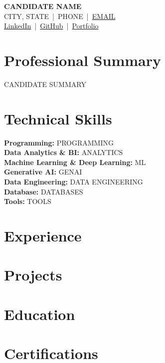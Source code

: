 \documentclass[10pt,a4paper]{article}
\begin{document}
\begin{center}
    {\LARGE\textbf{CANDIDATE NAME}}\\[2pt]
    CITY, STATE \,|\, PHONE \,|\, \href{mailto:EMAIL}{EMAIL}\\[1pt]
    \href{LINKEDIN}{LinkedIn} \,|\, \href{GITHUB}{GitHub} \,|\, \href{PORTFOLIO}{Portfolio}
\end{center}
\section*{Professional Summary}
CANDIDATE SUMMARY
\section*{Technical Skills}
\textbf{Programming:} PROGRAMMING\\
\textbf{Data Analytics \& BI:} ANALYTICS\\
\textbf{Machine Learning \& Deep Learning:} ML\\
\textbf{Generative AI:} GENAI\\
\textbf{Data Engineering:} DATA ENGINEERING\\
\textbf{Database:} DATABASES\\
\textbf{Tools:} TOOLS
\section*{Experience}
\section*{Projects}
\section*{Education}
\section*{Certifications}
\end{document}
